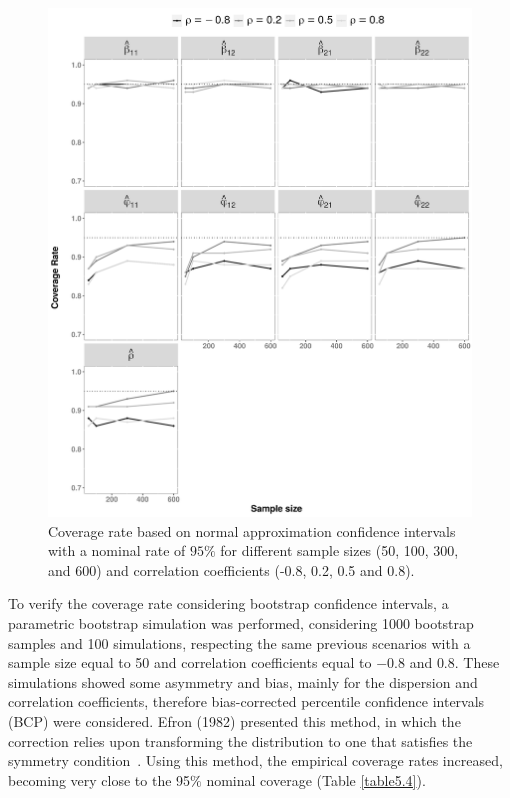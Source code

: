 \documentclass[useAMS,referee]{biom}
\begin{document}
\begin{figure}[!h]
\centering
\includegraphics[width=1\textwidth]{Figure_3}
\caption{Coverage rate based on normal approximation confidence intervals with a nominal rate of $95\%$ for different sample sizes (50, 100, 300, and 600)  and correlation coefficients (-0.8, 0.2, 0.5 and 0.8).}
\label{fig1.4}
\end{figure}

To verify the coverage rate considering bootstrap confidence intervals, a parametric bootstrap simulation was performed, considering 1000 bootstrap samples and 100 simulations, respecting the same previous scenarios with a sample size equal to 50 and correlation coefficients equal to $-0.8$ and $0.8$. These simulations showed some asymmetry and bias, mainly
for the dispersion and correlation coefficients, therefore bias-corrected percentile confidence intervals (BCP) were considered. Efron (1982) presented this method, in which the correction relies upon transforming the distribution to one that satisfies the symmetry condition~\citep{diciccio1988review,buckland1984monte}. Using this method, the
empirical coverage rates increased, becoming very close to the 95$\%$ nominal coverage (Table \ref{table5.4}).
\end{document}
